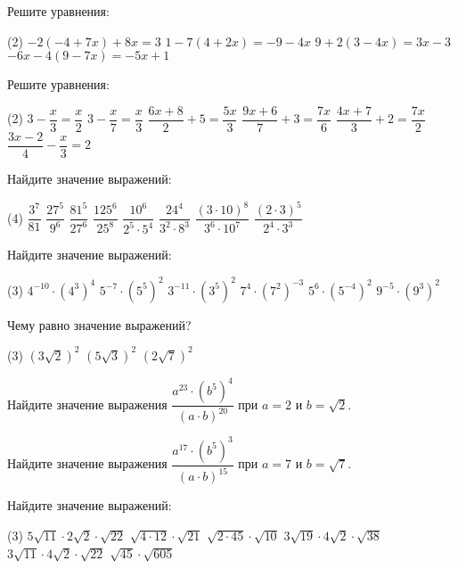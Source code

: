 \begin{class}[number=7]
	\begin{listofex}
		\item Решите уравнения:
		\begin{tasks}(2)
			\task \( -2(-4+7x)+8x=3 \)
			\task \( 1-7(4+2x)=-9-4x \)
			\task \( 9+2(3-4x)=3x-3 \)
			\task \( -6x-4(9-7x)=-5x+1 \)
		\end{tasks}
		\item Решите уравнения:
		\begin{tasks}(2)
			\task \( 3-\dfrac{x}{3}=\dfrac{x}{2} \)
			\task \( 3-\dfrac{x}{7}=\dfrac{x}{3} \)
			\task \( \dfrac{6x+8}{2}+5=\dfrac{5x}{3} \)
			\task \( \dfrac{9x+6}{7}+3=\dfrac{7x}{6} \)
			\task \( \dfrac{4x+7}{3}+2=\dfrac{7x}{2} \)
			\task \( \dfrac{3x-2}{4}-\dfrac{x}{3}=2 \)
		\end{tasks}
		\item Найдите значение выражений:
		\begin{tasks}(4)
			\task \( \dfrac{3^7}{81} \)
			\task \( \dfrac{27^5}{9^6} \)
			\task \( \dfrac{81^5}{27^6} \)
			\task \( \dfrac{125^6}{25^8} \)
			\task \( \dfrac{10^6}{2^5\cdot5^4} \)
			\task \( \dfrac{24^4}{3^2\cdot8^3} \)
			\task \( \dfrac{(3\cdot10)^8}{3^6\cdot10^7} \)
			\task \( \dfrac{(2\cdot3)^5}{2^4\cdot3^3} \)
		\end{tasks}
		\item Найдите значение выражений:
		\begin{tasks}(3)
			\task \( 4^{-10}\cdot(4^3)^4 \)
			\task \( 5^{-7}\cdot(5^5)^2 \)
			\task \( 3^{-11}\cdot(3^5)^2 \)
			\task \( 7^4\cdot(7^2)^{-3} \)
			\task \( 5^6\cdot(5^{-4})^2 \)
			\task \( 9^{-5}\cdot(9^3)^2 \)
		\end{tasks}
		\item Чему равно значение выражений?
		\begin{tasks}(3)
			\task \( (3\sqrt{2})^2 \)
			\task \( (5\sqrt{3})^2 \)
			\task \( (2\sqrt{7})^2 \)
		\end{tasks}
		\item Найдите значение выражения \( \dfrac{a^{23}\cdot(b^5)^4}{(a\cdot b)^{20}} \) при \( a=2 \) и \( b=\sqrt{2} \).
		\item Найдите значение выражения \( \dfrac{a^{17}\cdot(b^5)^3}{(a\cdot b)^{15}} \) при \( a=7 \) и \( b=\sqrt{7} \).
		\item Найдите значение выражений:
		\begin{tasks}(3)
			\task \( 5\sqrt{11}\cdot2\sqrt{2}\cdot\sqrt{22} \)
			\task \( \sqrt{4\cdot12}\cdot\sqrt{21} \)
			\task \( \sqrt{2\cdot45}\cdot\sqrt{10} \)
			\task \( 3\sqrt{19}\cdot4\sqrt{2}\cdot\sqrt{38} \)
			\task \( 3\sqrt{11}\cdot4\sqrt{2}\cdot\sqrt{22} \)
			\task \( \sqrt{45}\cdot\sqrt{605} \)
		\end{tasks}
	\end{listofex}
\end{class}

